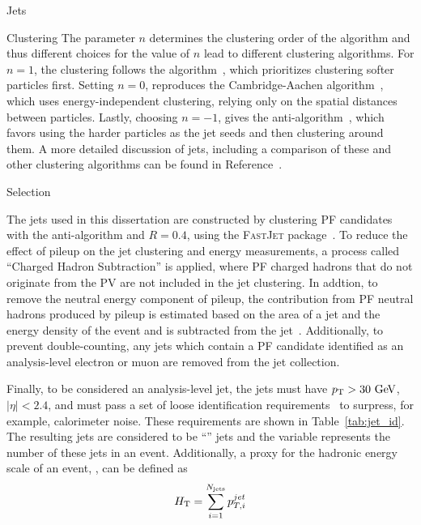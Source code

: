 \begin{section}{Jets}
\begin{subsection}{Clustering}
The parameter $n$ determines the clustering order of the algorithm and thus different choices for the value of $n$ lead to different clustering algorithms.
For $n = 1$, the clustering follows the \kT algorithm~\cite{Ellis:1993tq}, which prioritizes clustering softer particles first.
Setting $n = 0$, reproduces the Cambridge-Aachen algorithm~\cite{Dokshitzer:1997in}, which uses energy-independent clustering, relying only on the spatial distances between particles.
Lastly, choosing $n = -1$, gives the anti-\kT algorithm~\cite{Cacciari:2008gp}, which favors using the harder particles as the jet seeds and then clustering around them.
A more detailed discussion of jets, including a comparison of these and other clustering algorithms can be found in Reference~\cite{Salam:2009jx}.

\end{subsection}

\begin{subsection}{Selection}

The jets used in this dissertation are constructed by clustering PF candidates with the anti-\kT algorithm and $R = 0.4$, using the \textsc{FastJet} package~\cite{Cacciari:2011ma}.
To reduce the effect of pileup on the jet clustering and energy measurements, a process called ``Charged Hadron Subtraction'' is applied, where PF charged hadrons that do not originate from the PV are not included in the jet clustering.
In addtion, to remove the neutral energy component of pileup, the contribution from PF neutral hadrons produced by pileup is estimated based on the area of a jet and the energy density of the event and is subtracted from the jet~\cite{Cacciari:2007fd}.
Additionally, to prevent double-counting, any jets which contain a PF candidate identified as an analysis-level electron or muon are removed from the jet collection. 

Finally, to be considered an analysis-level jet, the jets must have $p_{\mathrm{T}} > 30~\mathrm{Ge\kern -0.1em V}$, $|\eta| < 2.4$, and must pass a set of loose identification requirements~\cite{jet_id,1748-0221-6-11-P11002} to surpress, for example, calorimeter noise.
These requirements are shown in Table~\ref{tab:jet_id}.
The resulting jets are considered to be ``\smallR'' jets  and the variable \Njets represents the number of these jets in an event.
Additionally, a proxy for the hadronic energy scale of an event, \HT, can be defined as
\begin{align}
H_{\mathrm{T}} = \sum_{i = 1}^{N_{\mathrm{jets}}} p_{T,i}^{jet}
\end{align}


\end{subsection}
\end{section}
